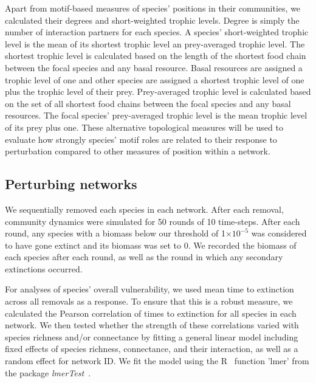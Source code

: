 \documentclass[12pt]{article}
\begin{document}
		Apart from motif-based measures of species' positions in their communities, we calculated their degrees and short-weighted trophic levels. Degree is simply the number of interaction partners for each species. A species' short-weighted trophic level is the mean of its shortest trophic level an prey-averaged trophic level. The shortest trophic level is calculated based on the length of the shortest food chain between the focal species and any basal resource. Basal resources are assigned a trophic level of one and other species are assigned a shortest trophic level of one plus the trophic level of their prey. Prey-averaged trophic level is calculated based on the set of all shortest food chains between the focal species and any basal resources. The focal species' prey-averaged trophic level is the mean trophic level of its prey plus one. These alternative topological measures will be used to evaluate how strongly species' motif roles are related to their response to perturbation compared to other measures of position within a network.




	\subsection*{Perturbing networks}

		We sequentially removed each species in each network. After each removal, community dynamics were simulated for 50 rounds of 10 time-steps. After each round, any species with a biomass below our threshold of 1$\times10^{-5}$ was considered to have gone extinct and its biomass was set to 0. We recorded the biomass of each species after each round, as well as the round in which any secondary extinctions occurred.


		For analyses of species' overall vulnerability, we used mean time to extinction across all removals as a response. To ensure that this is a robust measure, we calculated the Pearson correlation of times to extinction for all species in each network. We then tested whether the strength of these correlations varied with species richness and/or connectance by fitting a general linear model including fixed effects of species richness, connectance, and their interaction, as well as a random effect for network ID. We fit the model using the R~\citep{R} function 'lmer' from the package \emph{lmerTest}~\citep{lmerTest}.
\end{document}
